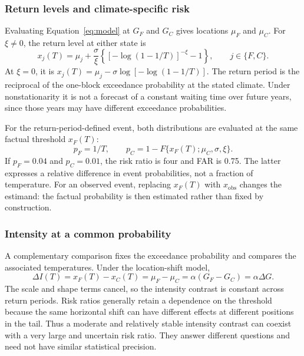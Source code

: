 \documentclass[11pt]{article}
\begin{document}
\subsubsection{Return levels and climate-specific risk}
Evaluating Equation~\eqref{eq:model} at $G_F$ and $G_C$ gives locations
$\mu_F$ and $\mu_C$. For $\xi\neq0$, the return level at either state is
\begin{equation}
x_j(T)=\mu_j+\frac{\sigma}{\xi}
\left\{[-\log(1-1/T)]^{-\xi}-1\right\},\qquad j\in\{F,C\}.
\label{eq:return}
\end{equation}
At $\xi=0$, it is
$x_j(T)=\mu_j-\sigma\log[-\log(1-1/T)]$. The return period is the
reciprocal of the one-block exceedance probability at the stated
climate. Under nonstationarity it is not a forecast of a constant
waiting time over future years, since those years may have different
exceedance probabilities.

For the return-period-defined event, both distributions are evaluated at
the same factual threshold $x_F(T)$:
\begin{equation}
p_F=1/T,\qquad p_C=1-F\{x_F(T);\mu_C,\sigma,\xi\}.
\end{equation}
If $p_F=0.04$ and $p_C=0.01$, the risk ratio is four and FAR is 0.75.
The latter expresses a relative difference in event probabilities, not
a fraction of temperature. For an observed event, replacing $x_F(T)$
with $x_{\mathrm{obs}}$ changes the estimand: the factual probability is
then estimated rather than fixed by construction.

\subsubsection{Intensity at a common probability}
A complementary comparison fixes the exceedance probability and
compares the associated temperatures. Under the location-shift model,
\begin{equation}
\Delta I(T)=x_F(T)-x_C(T)=\mu_F-\mu_C
=\alpha(G_F-G_C)=\alpha\Delta G.
\label{eq:intensity}
\end{equation}
The scale and shape terms cancel, so the intensity contrast is constant
across return periods. Risk ratios generally retain a dependence on the
threshold because the same horizontal shift can have different effects
at different positions in the tail. Thus a moderate and relatively
stable intensity contrast can coexist with a very large and uncertain
risk ratio. They answer different questions and need not have similar
statistical precision.
\end{document}
